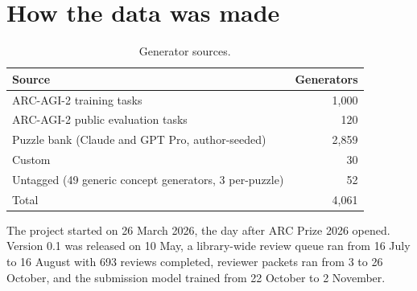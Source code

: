 \documentclass[11pt]{article}
\begin{document}
\section{How the data was made}
\label{sec:made}

\begin{table}[H]
\centering
\begin{tabular}{lr}
\toprule
Source & Generators \\
\midrule
ARC-AGI-2 training tasks & 1,000 \\
ARC-AGI-2 public evaluation tasks & 120 \\
Puzzle bank (Claude and GPT Pro, author-seeded) & 2,859 \\
Custom & 30 \\
Untagged (49 generic concept generators, 3 per-puzzle) & 52 \\
\midrule
Total & 4,061 \\
\bottomrule
\end{tabular}
\caption{Generator sources.}
\label{tab:sources}
\end{table}

The project started on 26 March 2026, the day after ARC Prize 2026 opened.
Version 0.1 was released on 10 May, a library-wide review queue ran from 16 July
to 16 August with 693 reviews completed, reviewer packets ran from 3 to 26 October, and the submission
model trained from 22 October to 2 November.
\end{document}
